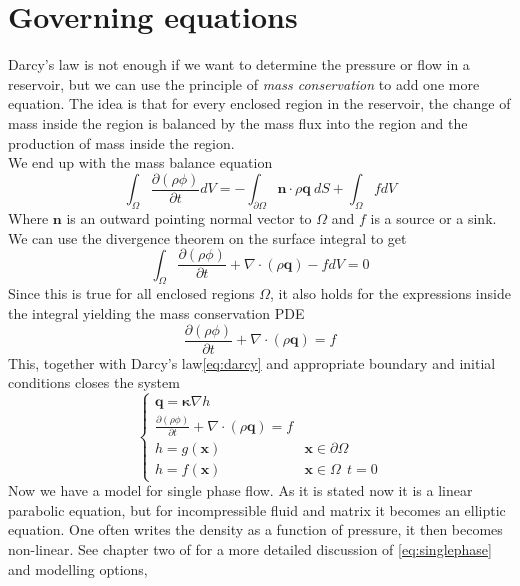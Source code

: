 \documentclass[../Main/main.tex]{subfiles}
\begin{document}
\section*{Governing equations}
Darcy's law is not enough if we want to determine the pressure or flow in a reservoir, but we can use the principle of \emph{mass conservation} to add one more equation. 
The idea is that for every enclosed region in the reservoir, the change of mass inside the region is balanced by the mass flux into the region and the production of mass inside the region.
\\
We end up with the mass balance equation
\begin{equation*}
\int_{\Omega}\frac{\partial (\rho \phi) }{\partial t} dV= -\int_{\partial\Omega}\pmb{n}\cdot\rho\pmb{q} \ dS+\int_{\Omega} f dV
\end{equation*}
Where $\pmb{n}$ is an outward pointing normal vector to $\Omega$ and $f$ is a source or a sink. We can use the divergence theorem on the surface integral to get
\begin{equation*}
\int_{\Omega}\frac{\partial (\rho \phi) }{\partial t} + \nabla \cdot(\rho \pmb{q}) -fdV= 0
\end{equation*}
Since this is true for all enclosed regions $\Omega$, it also holds for the expressions inside the integral yielding the mass conservation PDE
\begin{equation*}
\frac{\partial (\rho \phi) }{\partial t} + \nabla \cdot (\rho \pmb{q}) = f
\end{equation*}
This, together with Darcy's law\eqref{eq:darcy} and appropriate boundary and initial conditions closes the system
\begin{equation}\label{eq:singlephase}
\left\{\begin{matrix}
\pmb{q} =\pmb{\kappa} \nabla h \\ 
\frac{\partial (\rho \phi) }{\partial t} + \nabla \cdot(\rho \pmb{q}) =f& \\ 
 h = g(\pmb{x})&\pmb{x} \in \partial \Omega \\
 h = f(\pmb{x})& \pmb{x} \in \Omega \ \ t=0
\end{matrix}\right.
\end{equation}
Now we have a model for single phase flow. As it is stated now it is a linear parabolic equation, but for incompressible fluid and matrix it becomes an elliptic equation. One often writes the density as a function of pressure, it then becomes non-linear. See chapter two of \cite{Nordbotten} for a more detailed discussion of \eqref{eq:singlephase} and modelling options,
\end{document}
